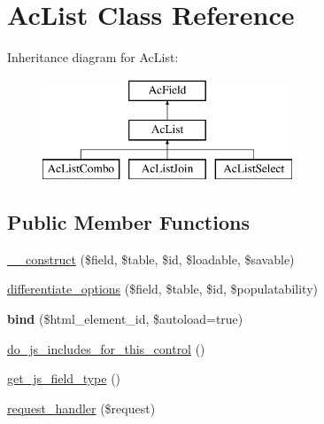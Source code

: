 \hypertarget{class_ac_list}{\section{\-Ac\-List \-Class \-Reference}
\label{class_ac_list}
}
\-Inheritance diagram for \-Ac\-List\-:\begin{figure}[H]
\begin{center}
\leavevmode
\includegraphics[height=3.000000cm]{class_ac_list}
\end{center}
\end{figure}
\subsection*{\-Public \-Member \-Functions}
\begin{DoxyCompactItemize}
\item 
\hyperlink{class_ac_list_a1300e91fbc0a035f38420e52237dde1f}{\-\_\-\-\_\-construct} (\$field, \$table, \$id, \$loadable, \$savable)
\item 
\hyperlink{class_ac_list_a04af9cbd7ca525658055a8ef00a52eec}{differentiate\-\_\-options} (\$field, \$table, \$id, \$populatability)
\item 
\hypertarget{class_ac_list_af1a25b2d567409641024be000c76f72d}{{\bfseries bind} (\$html\-\_\-element\-\_\-id, \$autoload=true)}\label{class_ac_list_af1a25b2d567409641024be000c76f72d}

\item 
\hyperlink{class_ac_list_afe52ff2e5403fdb103f85ddf4da6def8}{do\-\_\-js\-\_\-includes\-\_\-for\-\_\-this\-\_\-control} ()
\item 
\hyperlink{class_ac_list_a831bc758f74db3f9bee3e208187c67bf}{get\-\_\-js\-\_\-field\-\_\-type} ()
\item 
\hyperlink{class_ac_list_abde3fea649f4e1db70a5f2bcf45e42db}{request\-\_\-handler} (\$request)
\end{DoxyCompactItemize}
